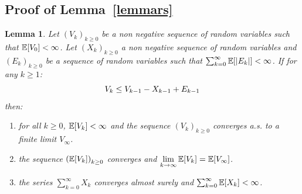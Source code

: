 \documentclass[11pt]{article}
\newtheorem*{Lemma*}{Lemma}
\theoremstyle{t}
\begin{document}
\clearpage

\subsection{Proof of Lemma~\ref{lemmars}}\label{appendix:lemma}
\begin{Lemma*}
Let $\left(V_k \right)_{k\geq0}$ be a non negative sequence of random variables such that $\EE[V_0] < \infty$. Let $\left(X_k \right)_{k\geq0}$ a non negative sequence of random variables and $\left(E_k \right)_{k \geq 0}$ be a sequence of random variables such that $\sum_{k=0}^{\infty}{\EE[|E_k|]} < \infty$. If for any $k \geq 1$:
\begin{equation}\notag
V_{k} \leq V_{k-1} - X_{k-1} + E_{k-1}
\end{equation}
 then:
\begin{enumerate}[label=(\roman*)]
\item for all $k \geq 0$, $\EE[V_k] < \infty$ and the sequence $\left(V_k \right)_{k\geq0}$  converges a.s. to a finite limit $V_{\infty}$.
\item the sequence $\left(\EE[V_k] \right)_{k\geq0}$ converges and $\lim \limits_{k \to \infty}\EE[V_k] = \EE[V_{\infty}] $.
\item the series $\sum_{k=0}^{\infty}{X_k}$ converges almost surely and $\sum_{k=0}^{\infty}{\EE[X_k]}< \infty$.
\end{enumerate}
\end{Lemma*}
\end{document}
